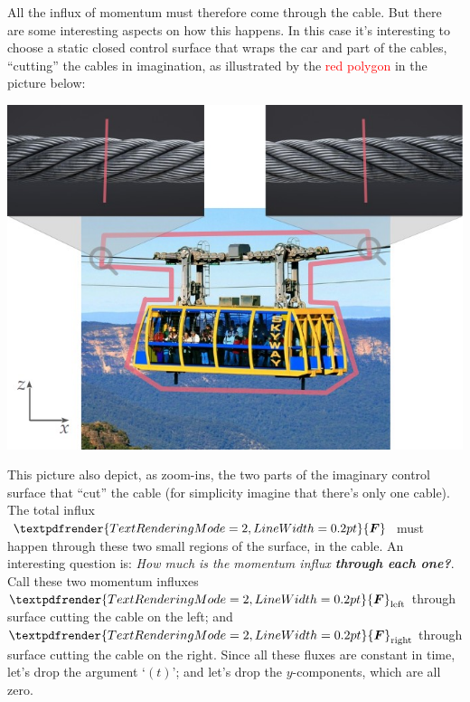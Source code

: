 \documentclass[a4paper,12pt,%
onecolumn,oneside,%
british%
]{memoir}
\renewcommand*{\bm}[1]{\textpdfrender{TextRenderingMode=2,LineWidth=0.2pt}{\boldsymbol{#1}}}
\renewcommand*{\|}[1][]{\nonscript\:#1\vert\nonscript\:\mathopen{}}
\newcommand*{\yF}{\bm{F}}
\begin{document}
All the influx of momentum must therefore come through the cable. But there are some interesting aspects on how this happens. In this case it's interesting to choose a static closed control surface that wraps the car and part of the cables,  \enquote{cutting} the cables in imagination, as illustrated by the \textcolor{red}{red polygon} in the picture below:
\begin{center}
  \includegraphics[align=t,width=\linewidth]{images/cablecardraw.jpg}
\end{center}
This picture also depict, as zoom-ins, the two parts of the imaginary control surface that \enquote{cut} the cable (for simplicity imagine that there's only one cable). The total influx $\yF$ must happen through these two small regions of the surface, in the cable. An interesting question is: \emph{How much is the momentum influx \textbf{through each one?}}. Call these two momentum influxes $\yF_{\text{left}}$ through surface cutting the cable on the left; and $\yF_{\text{right}}$ through surface cutting the cable on the right. Since all these fluxes are constant in time, let's drop the argument \enquote*{$(t)$}; and let's drop the $y$-components, which are all zero.
\end{document}
